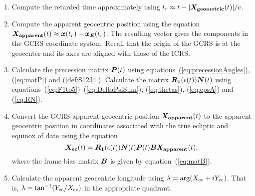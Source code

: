 \documentclass[12pt]{article}
\newcommand \beq {\begin{equation}}
\newcommand \eeq {\end{equation}}
\newcommand{\ve}[1]{\mbox{\boldmath $#1$}}
\begin{document}
\begin{CJK}{UTF8}{bkai}
\begin{enumerate}
\item Compute the retarded time approximately using 
$t_r \approx t - |\ve{X_{\rm geometric}}(t)|/c$.

\item Compute the apparent geocentric position using the equation 
$\ve{X_{\rm apparent}}(t) \approx \ve{x}(t_r) - \ve{x_E}(t_r)$. 
The resulting vector gives the components in the GCRS coordinate system. 
Recall that the origin of the GCRS is at the geocenter and its axes 
are aligned with those of the ICRS.

\item Calculate the precession matrix $\ve{P}(t)$ using 
equations~(\ref{eq:precessionAngles}), (\ref{eq:matP}) and (\ref{def:S1234}). 
Calculate the matrix $\ve{R_1}(\epsilon(t)) \ve{N}(t)$ using 
equations~(\ref{eq:F1to5})--(\ref{eq:DeltaPsiSum}), (\ref{eq:thetas}), (\ref{eq:epsA}) 
and (\ref{eq:RN}).

\item Convert the GCRS apparent geocentric position $\ve{X_{\rm apparent}}(t)$ to 
the apparent geocentric position in coordinates associated with the 
true ecliptic and equinox of date using the equation 
\beq
  \ve{X_{\rm ec}}(t) = \ve{R_1}(\epsilon(t)) \ve{N}(t) \ve{P}(t) \ve{B} 
\ve{X_{\rm apparent}}(t) ,
\label{eq:Xec}
\eeq
where the frame bias matrix $\ve{B}$ is given by equation~(\ref{eq:matB}).

\item Calculate the apparent geocentric longitude using 
$\lambda = {\rm arg}(X_{\rm ec} + i Y_{\rm ec})$. That is, 
$\lambda = \tan^{-1}(Y_{\rm ec}/X_{\rm ec})$ in the appropriate quadrant.
\end{enumerate}


\end{CJK}
\end{document}
